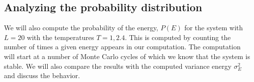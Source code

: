 \documentclass[../main.tex]{subfiles}
\begin{document}


\subsection{Analyzing the probability distribution}
We will also compute the probability of the energy, $P(E)$ for the system with $L = 20$ with the temperatures $T= 1, 2.4$. This is computed by counting the number of times a given energy appears in our computation. The computation will start at a number of Monte Carlo cycles of which we know that the system is stable. We will also compare the results with the computed variance energy $\sigma_E^2$ and discuss the behavior.
\end{document}
